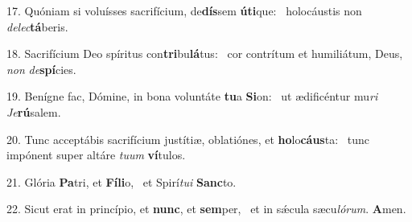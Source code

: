 17. Quóniam si voluísses sacrifícium, de\textbf{dís}sem \textbf{ú}\textbf{ti}que: \ast\  holocáustis non \textit{de}\textit{lec}\textbf{tá}beris.\

18. Sacrifícium Deo spíritus con\textbf{tri}bu\textbf{lá}tus: \ast\  cor contrítum et humiliátum, Deus, \textit{non} \textit{de}\textbf{spí}cies.\

19. Benígne fac, Dómine, in bona voluntáte \textbf{tu}a \textbf{Si}on: \ast\  ut ædificéntur mu\textit{ri} \textit{Je}\textbf{rú}salem.\

20. Tunc acceptábis sacrifícium justítiæ, oblatiónes, et \textbf{ho}lo\textbf{cáus}ta: \ast\  tunc impónent super altáre \textit{tu}\textit{um} \textbf{ví}tulos.\

21. Glória \textbf{Pa}tri, et \textbf{Fí}\textbf{li}o, \ast\  et Spirí\textit{tu}\textit{i} \textbf{Sanc}to.\

22. Sicut erat in princípio, et \textbf{nunc}, et \textbf{sem}per, \ast\  et in sǽcula sæcu\textit{ló}\textit{rum}. \textbf{A}men.\

